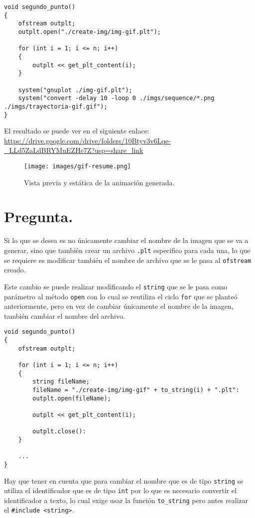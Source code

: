 \documentclass[10pt]{article}
\begin{document}
    \begin{verbatim}
void segundo_punto()
{
    ofstream outplt;
    outplt.open("./create-img/img-gif.plt");

    for (int i = 1; i <= n; i++)
    {
        outplt << get_plt_content(i);
    }

    system("gnuplot ./img-gif.plt");
    system("convert -delay 10 -loop 0 ./imgs/sequence/*.png ./imgs/trayectoria-gif.gif");
}
    \end{verbatim}    

    
    El resultado se puede ver en el siguiente enlace: \url{https://drive.google.com/drive/folders/10Btyv3v6Lqe-_LLd5ZaLdBRYMuEZHe7Z?usp=share_link}
    
    \begin{figure}[H]
        \centering
        \texttt{[image: images/gif-resume.png]}
        \caption{Vista previa y estática de la animación generada.}
        \label{img}
    \end{figure}
    
    
    
    
    \section{Pregunta.}
    
    Si lo que se desea es no únicamente cambiar el nombre de la imagen que se va a generar, sino que también crear un archivo \texttt{.plt} especifico para cada una, lo que se requiere es modificar también el nombre de archivo que se le pasa al \texttt{ofstream} creado.
    
    Este cambio se puede realizar modificando el \texttt{string} que se le pasa como parámetro al método \texttt{open} con lo cual se reutiliza el ciclo \texttt{for} que se planteó anteriormente, pero en vez de cambiar únicamente el nombre de la imagen, también cambiar el nombre del archivo. 
    
    \begin{verbatim}
void segundo_punto()
{
    ofstream outplt;

    for (int i = 1; i <= n; i++)
    {
        string fileName;
        fileName = "./create-img/img-gif" + to_string(i) + ".plt":
        outplt.open(fileName);
        
        outplt << get_plt_content(i);
        
        outplt.close():
    }

    ...
}
    \end{verbatim}
    
    Hay que tener en cuenta que para cambiar el nombre que es de tipo \texttt{string} se utiliza el identificador que es de tipo \texttt{int} por lo que es necesario convertir el identificador a texto, lo cual exige usar la función \texttt{to\_string} pero antes realizar el \texttt{\#include <string>}.
    
    
\end{document}
